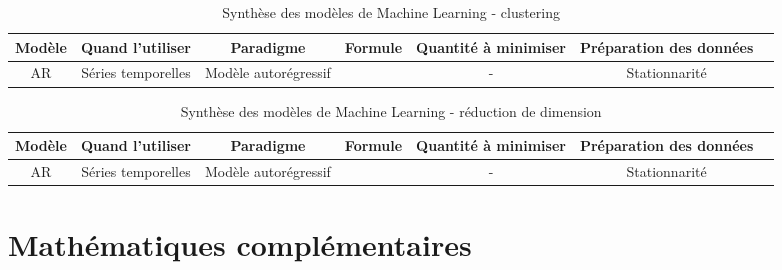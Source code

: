 \newpage

\begin{table}[h!]
\scriptsize
\begin{tabularx}{\textwidth}{|C|C|C|C|C|C|C|}
\hline
\textbf{Modèle}      & \textbf{Quand l'utiliser}                                           & \textbf{Paradigme}                   & \textbf{Formule}                                                                & \textbf{Quantité à minimiser}         & \textbf{Préparation des données}  \\
\hline

AR                   & Séries temporelles                                                  & Modèle autorégressif                 &                                                                                 & -                                     & Stationnarité                      \\
\hline


\end{tabularx}
\caption{Synthèse des modèles de Machine Learning - clustering}
\end{table}

\newpage

\begin{table}[h!]
\scriptsize
\begin{tabularx}{\textwidth}{|C|C|C|C|C|C|C|}
\hline
\textbf{Modèle}      & \textbf{Quand l'utiliser}                                           & \textbf{Paradigme}                   & \textbf{Formule}                                                                & \textbf{Quantité à minimiser}         & \textbf{Préparation des données}  \\
\hline

AR                   & Séries temporelles                                                  & Modèle autorégressif                 &                                                                                 & -                                     & Stationnarité                      \\
\hline


\end{tabularx}
\caption{Synthèse des modèles de Machine Learning - réduction de dimension}
\end{table}



\chapter{Mathématiques complémentaires}
\label{sec:match_compl}

